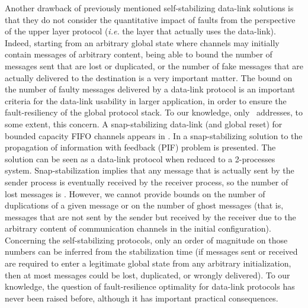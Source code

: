 \documentclass[11pt]{article}
\begin{document}
Another drawback of previously mentioned self-stabilizing data-link solutions is that they do not consider the quantitative impact of faults from the perspective of the upper layer protocol (\emph{i.e.} the layer that actually uses the data-link). Indeed, starting from an arbitrary global state where channels may initially contain messages 
of arbitrary content, being able to bound the number of messages sent that are lost or duplicated, or the number of fake messages that are actually delivered to the destination is a very important matter. The bound on the number of faulty messages delivered by a data-link protocol is an important criteria for the data-link usability in larger application, in order to ensure the fault-resiliency of the global protocol stack. To our knowledge, only~\cite{DT06c,DDNT10j} addresses, to some extent, this concern. A snap-stabilizing data-link (and global reset) for bounded capacity FIFO channels appears in \cite{DT06c}. In \cite{DDNT10j} a snap-stabilizing solution to the propagation of information with feedback (PIF) problem is presented. The solution can be seen as a data-link protocol when reduced to a 2-processes system. Snap-stabilization implies that any message that is actually sent by the sender process is eventually received by the receiver process, so the number of lost messages is . However, we cannot provide bounds on the number of duplications of a given message or on the number of ghost messages (that is, messages that are not sent by the sender  but received by the receiver due to the arbitrary content of communication channels in the initial configuration). Concerning the self-stabilizing protocols, only an order of magnitude on those numbers can be inferred from the stabilization time (if  messages sent or received are required to enter a legitimate global state from any arbitrary initialization, then at most  messages could be lost, duplicated, or wrongly delivered). To our knowledge, the question of fault-resilience optimality for data-link protocols has never been raised before, although it has important practical consequences. 
\end{document}
